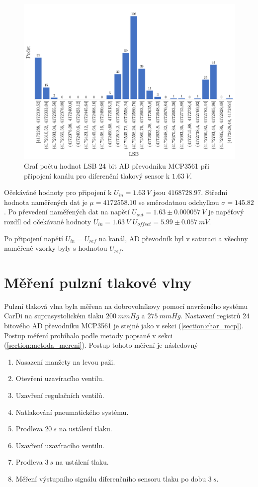 \begin{figure}[H]
    \caption{Graf počtu hodnot LSB 24 bit AD převodníku MCP3561 při připojení kanálu
        pro diferenční tlakový sensor k  $1.63 \ V$.}
    \includegraphics[width=1\textwidth]{graphs/mcp_16.png}
\end{figure}
Očekáváné hodnoty pro připojení k $U_{in} = 1.63 \ V$ jsou $4168728.97$. Střední hodnota naměřených dat je $\mu = 4172558.10$ se směrodatnou odchylkou $\sigma = 145.82$. Po převedení naměřených dat na napětí $U_{out} = 1.63 \pm 0.000057\ V$ je napěťový rozdíl od očekávané hodnoty $U_{in} = 1.63 \ V$
$U_{offset} = 5.99 \pm 0.057 \ mV$.
\par
Po připojení napětí $U_{in} = U_{ref}$ na kanál, AD převodník byl v saturaci a všechny naměřené vzorky byly s hodnotou $U_{ref}$.

\pagebreak
\section{Měření pulzní tlakové vlny}
Pulzní tlaková vlna byla měřena na dobrovolníkovy pomocí navrženého systému CarDi na suprasystolickém tlaku $200 \ mmHg$ a $275 \ mmHg$. Nastavení registrů 24 bitového AD převodníku MCP3561 je stejné jako v sekci (\ref{section:char_mcp}).
Postup měření probíhalo podle metody popsané v sekci (\ref{section:metoda_mereni}). Postup tohoto měření je následovný
\begin{enumerate}
    \item Nasazení manžety na levou paži.
    \item Otevření uzavíracího ventilu.
    \item Uzavření regulačních ventilů.
    \item Natlakování pneumatického systému.
    \item Prodleva $20 \ s$ na ustálení tlaku.
    \item Uzavření uzavíracího ventilu.
    \item Prodleva $3 \ s$ na ustálení tlaku.
    \item Měření výstupního signálu diferenčního sensoru tlaku po dobu $3 \ s $.
\end{enumerate}


